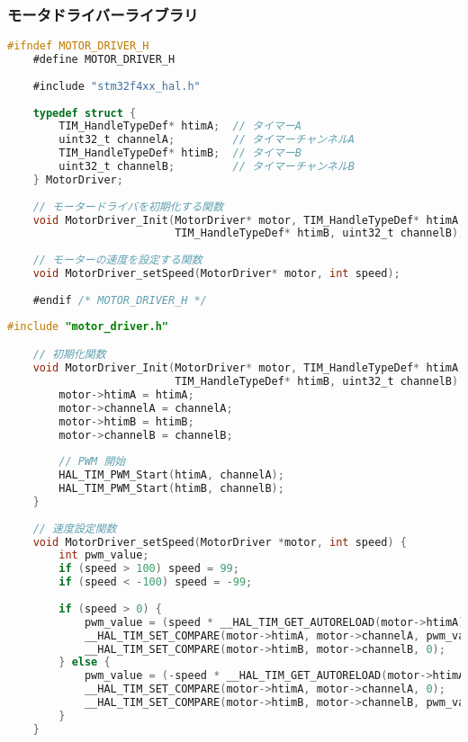 \subsubsection{モータドライバーライブラリ}

\begin{lstlisting}[language=C, caption=モータドライバーライブラリ(motor\_driver.h)]
    #ifndef MOTOR_DRIVER_H
    #define MOTOR_DRIVER_H
    
    #include "stm32f4xx_hal.h"
    
    typedef struct {
        TIM_HandleTypeDef* htimA;  // タイマーA
        uint32_t channelA;         // タイマーチャンネルA
        TIM_HandleTypeDef* htimB;  // タイマーB
        uint32_t channelB;         // タイマーチャンネルB
    } MotorDriver;
    
    // モータードライバを初期化する関数
    void MotorDriver_Init(MotorDriver* motor, TIM_HandleTypeDef* htimA, uint32_t channelA,
                          TIM_HandleTypeDef* htimB, uint32_t channelB);
    
    // モーターの速度を設定する関数
    void MotorDriver_setSpeed(MotorDriver* motor, int speed);
    
    #endif /* MOTOR_DRIVER_H */
\end{lstlisting}

\begin{lstlisting}[language=C, caption=モータドライバーライブラリ(motor\_driver.c)]
    #include "motor_driver.h"

    // 初期化関数
    void MotorDriver_Init(MotorDriver* motor, TIM_HandleTypeDef* htimA, uint32_t channelA,
                          TIM_HandleTypeDef* htimB, uint32_t channelB) {
        motor->htimA = htimA;
        motor->channelA = channelA;
        motor->htimB = htimB;
        motor->channelB = channelB;
    
        // PWM 開始
        HAL_TIM_PWM_Start(htimA, channelA);
        HAL_TIM_PWM_Start(htimB, channelB);
    }
    
    // 速度設定関数
    void MotorDriver_setSpeed(MotorDriver *motor, int speed) {
        int pwm_value;
        if (speed > 100) speed = 99;
        if (speed < -100) speed = -99;
    
        if (speed > 0) {
            pwm_value = (speed * __HAL_TIM_GET_AUTORELOAD(motor->htimA)) / 100;
            __HAL_TIM_SET_COMPARE(motor->htimA, motor->channelA, pwm_value);
            __HAL_TIM_SET_COMPARE(motor->htimB, motor->channelB, 0);
        } else {
            pwm_value = (-speed * __HAL_TIM_GET_AUTORELOAD(motor->htimA)) / 100;
            __HAL_TIM_SET_COMPARE(motor->htimA, motor->channelA, 0);
            __HAL_TIM_SET_COMPARE(motor->htimB, motor->channelB, pwm_value);
        }
    }
\end{lstlisting}

